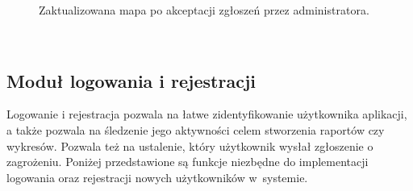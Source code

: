\noindent
\setlength{\fboxrule}{0.5pt}
\begin{figure}[H]
    \centering
    \caption{Zaktualizowana mapa po akceptacji zgłoszeń przez administratora.}
    \label{widok:markeraccepted1}
\end{figure}
\\
\subsection{Moduł logowania i rejestracji}
Logowanie i rejestracja pozwala na łatwe zidentyfikowanie użytkownika aplikacji, a także pozwala na śledzenie jego aktywności celem stworzenia raportów czy wykresów. Pozwala też na ustalenie, który użytkownik wysłał zgłoszenie o zagrożeniu. Poniżej przedstawione są funkcje niezbędne do implementacji logowania oraz rejestracji nowych użytkowników w~systemie.
\\

